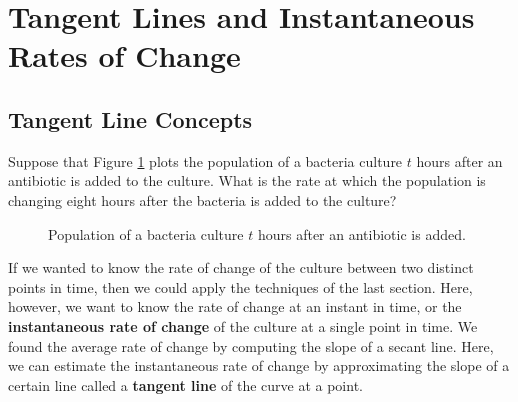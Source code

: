 \section{Tangent Lines and Instantaneous Rates of Change}
\label{sec:tangents}

\subsection{Tangent Line Concepts}

\begin{example} 
Suppose that Figure \ref{fig:2-2-bacteria} plots the population of a bacteria culture $t$ hours after an antibiotic is added to the culture. What is the rate at which the population  is changing eight hours after the bacteria is added to the culture?
\end{example}

\begin{figure}[ht!]
\centering
{}
\caption{Population of a bacteria culture $t$ hours after an antibiotic is added.}
\label{fig:2-2-bacteria}
\end{figure}

If we wanted to know the rate of change of the culture between two distinct points in time, then we could apply the techniques of the last section. Here, however, we want to know the rate of change at an instant in time, or the {\bf instantaneous rate of change} of the culture at a single point in time. We found the average rate of change by computing the slope of a secant line. Here, we can estimate the instantaneous rate of change by approximating the slope of a certain line called a {\bf tangent line} of the curve at a point. 


